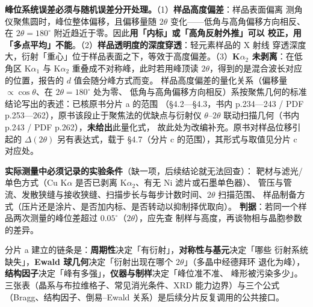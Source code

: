 \begin{pitfall}
\textbf{峰位系统误差必须与随机误差分开处理。}（1）\textbf{样品高度偏差}：样品表面偏离
测角仪聚焦圆时，峰位整体偏移，且偏移量随 $2\theta$ 变化——低角与高角偏移方向相反、
在 $2\theta=180^{\circ}$ 附近趋近于零。因此\textbf{用「内标」或「高角反射外推」可以
校正，用「多点平均」不能}。（2）\textbf{样品透明度的深度穿透}：轻元素样品的 X 射线
穿透深度大，衍射「重心」位于样品表面之下，等效于高度偏差。（3）\textbf{K$\alpha_2$
未剥离}：在低角区 K$\alpha_1$ 与 K$\alpha_2$ 重叠成不对称峰，此时若用峰顶读
$2\theta$，得到的是混合波长对应的位置，报告的 $d$ 值会随分峰方式而变。
样品高度偏差的量化关系（偏移量 $\propto\cos\theta$、在 $2\theta=180^{\circ}$ 处为零、
低角与高角偏移方向相反）系按聚焦几何的标准结论写出的表述：已核原书分片 a 的范围
（§4.2—§4.3，书内 p.234—243 / PDF p.253—262），原书该段止于聚焦法的优缺点与衍射仪
$\theta$--$2\theta$ 联动扫描几何（书内 p.243 / PDF p.262），\textbf{未给出}此量化式，
故此处为改编补充。原书对样品位移引起的 $\Delta(2\theta)$ 另有表达式，载于 §4.7（分片 c
的范围），其形式与取值见分片 c 对应处。
\end{pitfall}

\begin{measure}
\textbf{实际测量中必须记录的实验条件}（缺一项，后续结论就无法回查）：
靶材与滤光/单色方式（Cu K$\alpha$ 是否已剥离 K$\alpha_2$、有无 Ni 滤片或石墨单色器）、
管压与管流、发散狭缝与接收狭缝、扫描步长与每步计数时间、$2\theta$ 扫描范围、
样品制备方式（压片还是涂片、是否加内标、是否转动以抑制择优取向）。
\textbf{判据}：若同一个样品两次测量的峰位差超过 $0.05^{\circ}$（$2\theta$），应先查
制样与高度，再谈物相与晶胞参数的差异。
\end{measure}

\begin{methodsum}
分片 a 建立的链条是：\textbf{周期性}决定「有衍射」，\textbf{对称性与基元}决定「哪些
衍射系统缺失」，\textbf{Ewald 球几何}决定「衍射出现在哪个 $2\theta$」（多晶中经德拜环
退化为峰），\textbf{结构因子}决定「峰有多强」，\textbf{仪器与制样}决定「峰位准不准、
峰形被污染多少」。三张表（晶系与布拉维格子、常见消光条件、XRD 能力边界）与三个公式
（Bragg、结构因子、倒易--Ewald 关系）是后续分片反复调用的公共接口。
\end{methodsum}

